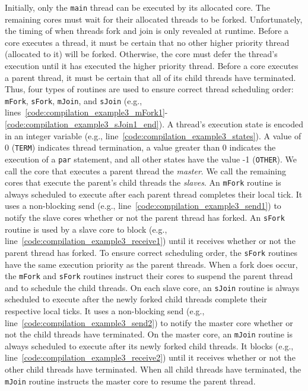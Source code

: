 Initially, only the \verb$main$ thread can be executed by
its allocated core. The remaining cores must wait for their
allocated threads to be forked.
Unfortunately, the timing of when threads fork and join is only
revealed at runtime. Before a core executes
a thread, it must be certain that no other higher priority
thread (allocated to it) will be forked. Otherwise, the core
must defer the thread's execution until it has executed the
higher priority thread. Before a core executes a
parent thread, it must be certain that all of its child threads
have terminated. Thus, four types of routines are used to
ensure correct thread scheduling order: \verb$mFork$, 
\verb$sFork$, \verb$mJoin$, and \verb$sJoin$ 
(e.g., lines~\ref{code:compilation_example3_mFork1}-\ref{code:compilation_example3_sJoin1_end}). 
A thread's execution state is encoded 
in an integer variable (e.g., line~\ref{code:compilation_example3_states}). 
A value of 0 (\verb$TERM$) indicates thread termination,
a value greater than 0 indicates the execution of a
\verb$par$ statement, and all other states have the value 
-1 (\verb$OTHER$). We call the core that executes a parent 
thread the \emph{master}. We call the remaining cores that
execute the parent's child threads the \emph{slaves}. An
\verb$mFork$ routine is always scheduled to execute after
each parent thread completes their local tick. It uses a non-blocking send (e.g., 
line~\ref{code:compilation_example3_send1}) to notify
the slave cores whether or not the parent thread has forked.
An \verb$sFork$ routine is used by a slave core to block
(e.g., line~\ref{code:compilation_example3_receive1})
until it receives whether or not the parent thread has
forked. To ensure correct scheduling order, the 
\verb$sFork$ routines have the same execution priority as 
the parent threads. When a fork does occur, the \verb$mFork$
and \verb$sFork$ routines instruct their cores to suspend
the parent thread and to schedule the child threads. On each
slave core, an \verb$sJoin$ routine is always scheduled to
execute after the newly forked child threads complete 
their respective local ticks. It uses a
non-blocking send (e.g., line~\ref{code:compilation_example3_send2}) 
to notify the master core whether or not
the child threads have terminated. On the master core, an
\verb$mJoin$ routine is always scheduled to execute after
its newly forked child threads. It blocks 
(e.g., line~\ref{code:compilation_example3_receive2}) until it receives
whether or not the other child threads have terminated. When
all child threads have terminated, the \verb$mJoin$ 
routine instructs the master core to resume the parent 
thread. 

